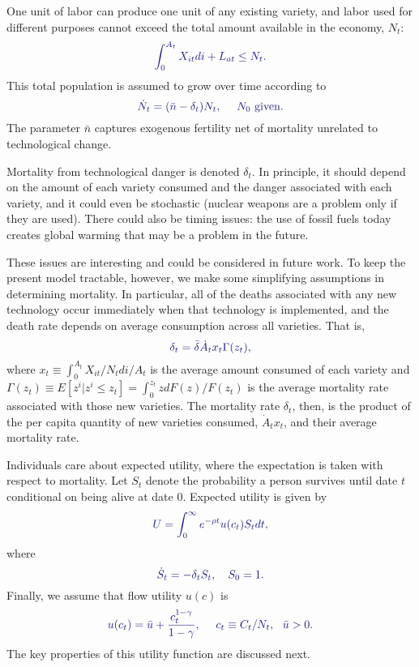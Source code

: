 \documentclass[12pt,twoside]{article}
\newcommand{\clr}[1]{{\color{ChadBlue} #1}}
\begin{document}
One unit of labor can produce one unit of any existing variety, and
labor used for different purposes cannot exceed the total amount
available in the economy, $N_t$:
\begin{equation}
\label{eq:RC}
\clr{ \int_0 ^{A_t} X_{it} di + L_{at} \leq N_t. }
\end{equation}
This total population is assumed to grow over time according to
\begin{equation}
\label{eq:Ndot}
\clr{ \dot{N}_t = (\bar{n} - \delta_t) N_t, \ \ \ \ N_0 \mbox{ given}. }
\end{equation}
The parameter $\bar{n}$ captures exogenous fertility net of mortality
unrelated to technological change.

Mortality from technological danger is denoted $\delta_t$. In principle,
it should depend on the amount of each variety consumed and the danger
associated with each variety, and it could even be stochastic (nuclear
weapons are a problem only if they are used). There could also be timing
issues: the use of fossil fuels today creates global warming that may be
a problem in the future.

These issues are interesting and could be considered in future work. To
keep the present model tractable, however, we make some simplifying
assumptions in determining mortality. In particular, all of the deaths
associated with any new technology occur immediately when that
technology is implemented, and the death rate depends on average
consumption across all varieties.  That is,
\begin{equation}
\label{eq:dlta}
\clr{ \delta_t = \bar{\delta} \dot{A}_t x_t \Gamma(z_t),}
\end{equation}
where $x_t \equiv \int_0 ^{A_t} X_{it}/N_t di / A_t$ is the average
amount consumed of each variety and $\Gamma(z_t) \equiv E[z^i | z^i \leq
  z_t] = \int_0 ^{z_t} z dF(z) / F(z_t)$ is the average mortality rate
associated with those new varieties. The mortality rate $\delta_t$,
then, is the product of the per capita quantity of new varieties
consumed, $\dot{A}_t x_t$, and their average mortality rate.

Individuals care about expected utility, where the expectation is
taken with respect to mortality.  Let $S_t$ denote the probability a
person survives until date $t$ conditional on being alive at date 0.
Expected utility is given by
\begin{equation}
\clr{ U= \int_0 ^\infty e^{-\rho t} u(c_t) S_t dt,}
\end{equation}
where
\begin{equation}
\clr{ \dot{S}_t = -\delta_t S_t, \ \ \ S_0=1.}
\end{equation}
Finally, we assume that flow utility $u(c)$ is
\begin{equation}
\label{eq:u}
\clr{ u(c_t) = \bar{u} + \frac{c_t ^{1-\gamma}}{1-\gamma}, \ \ \ \ c_t
  \equiv C_t/N_t, \ \ \bar{u}>0.}
\end{equation}
The key properties of this utility function are discussed next.
\end{document}
